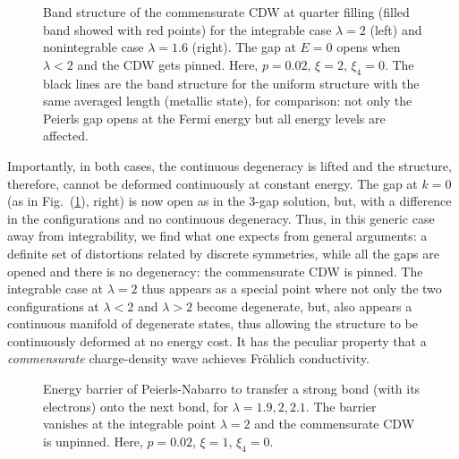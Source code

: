 \documentclass[]{revtex4-1}
\begin{document}
\begin{figure}[h]
           \caption{Band structure of the commensurate CDW at quarter filling (filled band showed with red points) for the integrable case $\lambda=2$ (left) and nonintegrable case $\lambda=1.6$ (right). The gap at $E=0$ opens when $\lambda<2$ and the CDW gets pinned. Here, $p=0.02$, $\xi=2$, $\xi_4=0$. The black lines are the band structure for the uniform structure with the same averaged length (metallic state), for comparison: not only the Peierls gap opens at the Fermi energy but all energy levels are affected.}
  \label{bandstructuresolutionN4}
\end{figure}

Importantly, in both cases, the continuous degeneracy is lifted and the structure, therefore, cannot be deformed continuously at constant energy. The gap at $k=0$ (as in Fig.~(\ref{bandstructuresolutionN4}), right) is now open as in the 3-gap solution, but, with a difference in the configurations and no continuous degeneracy. Thus, in this generic case away from integrability, we find what one expects from general arguments: a definite set of distortions related by discrete symmetries, while all the gaps are opened and there is no degeneracy: the commensurate CDW is pinned.
The integrable case  at $\lambda=2$ thus appears as a special point where not only the two configurations at $\lambda<2$ and $\lambda>2$ become degenerate, but, also appears a continuous manifold of degenerate states, thus allowing the structure to be continuously deformed at no energy cost. It has the peculiar property that a \textit{commensurate} charge-density wave achieves Fr\"ohlich conductivity. 

\begin{figure}[t] \begin{center}
 \end{center} \caption{Energy barrier of Peierls-Nabarro to transfer a strong bond (with its electrons) onto the next bond, for $\lambda=1.9,2,2.1$. The barrier vanishes at the integrable point $\lambda=2$ and the commensurate CDW is unpinned. Here, $p=0.02$, $\xi=1$, $\xi_4=0$.}
  \label{barrierPeierls}
\end{figure}
\end{document}
